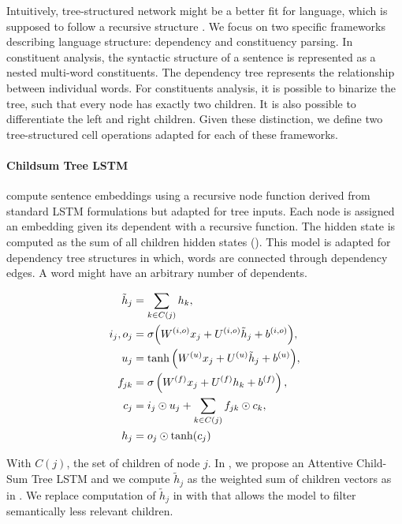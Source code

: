 Intuitively, tree-structured network might be a better fit for language, which is supposed to follow a recursive structure . We focus on two specific frameworks describing language structure: dependency and constituency parsing. In constituent analysis, the syntactic structure of a sentence is represented as a nested multi-word constituents. The dependency tree represents the relationship between individual words. For constituents analysis, it is possible to binarize the tree, such that every node has exactly two children. It is also possible to differentiate the left and right children. Given these distinction, we define two tree-structured cell operations adapted for each of these frameworks.

\paragraph{Childsum Tree LSTM} \textcite{tai_15} compute sentence embeddings using a recursive node function derived from standard LSTM formulations but adapted for tree inputs. Each node is assigned an embedding given its dependent with a recursive function. The hidden state is computed as the sum of all children hidden states (). This model is adapted for dependency tree structures in which, words are connected through dependency edges. A word might have an arbitrary number of dependents.

\begin{align}
\tilde{h}_j &= \sum_{k \in C(j)} h_k, \labeq{treelstm-def} \\
i_j, o_j &=\sigma \Big( W^{(i, o)} x_j + U^{(i, o)} \tilde{h}_j + b^{(i, o)} \Big), \\
u_j &=\tanh \Big( W^{(u)} x_j + U^{(u)} \tilde{h}_j + b^{(u)} \Big), \\
f_{jk} &= \sigma\left( W^{(f)} x_j + U^{(f)} h_k + b^{(f)} \right), \labeq{treelstm-def-f}\\
c_j &= i_j \odot u_j + \sum_{k\in C(j)} f_{jk} \odot c_{k}, \\
h_j &= o_j \odot \tanh(c_j) \labeq{treelstm-def-last}
\end{align}

With $C(j)$, the set of children of node $j$. In \textcite{simoulin_2021a}, we propose an Attentive Child-Sum Tree LSTM and we compute $\tilde{h}_j$ as the weighted sum of children vectors as in \textcite{zhou_16}. We replace computation of $\tilde{h}_j$ in  with  that allows the model to filter semantically less relevant children.

